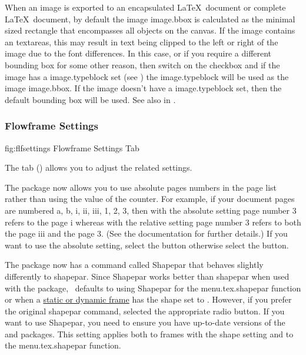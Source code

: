 
When an image is exported to an encapsulated \LaTeX\ document
or complete \LaTeX\ document, by default the image \gls{image.bbox}
is calculated as the minimal sized rectangle that encompasses all
\glspl{object} on the \gls{canvas}. If the image contains an
\glspl*{textarea}, this may result in text being clipped to the left
or right of the image due to the font differences. In this case, or
if you require a different bounding box for some other reason, then
switch on the 
\gls*{checkbox} and if the image has a \gls{image.typeblock} set
(see ) the \gls{image.typeblock} will be used as the image
\gls{image.bbox}. If the image doesn't have a \gls{image.typeblock} set, then the
default bounding box will be used. See also 
in .


\subsubsection{Flowframe Settings}\label{sec:texconfigflf}


\FloatFig
 {fig:flfsettings}
 {}
 {Flowframe Settings Tab}

The  tab
() allows you to adjust the
 related settings.

The  package now allows you to use absolute pages
numbers in the page list rather than using the value of the
 counter. For example, if your document pages are numbered
a, b, i, ii, iii, 1, 2, 3, then with the absolute setting page
number 3 refers to the page  i whereas with the
relative setting page number 3 refers to both the page
 iii and the page  3. (See the
 documentation for further details.) If you want to
use the absolute setting, select the
 button otherwise select the
 button.

The  package now has a command called
\gls{Shapepar} that behaves slightly differently to
\gls{shapepar}. Since \gls{Shapepar} works better than
\gls{shapepar} when used with the  package,
\FlowframTk\ defaults to using \gls{Shapepar} for the
\gls{menu.tex.shapepar} function or when a
\hyperref[sec:flowframe]{static or dynamic frame} has the
shape set to . However, if
you prefer the original \gls{shapepar} command, selected the
appropriate  radio button.
If you want to use \gls{Shapepar}, you need to ensure you have
up-to-date versions of the  and 
packages. This setting applies both to frames with the
 shape setting and to the
\gls{menu.tex.shapepar} function.

